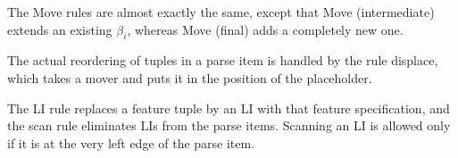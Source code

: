 \begin{prooftree}
\end{prooftree}
%
\begin{prooftree}
\end{prooftree}
%
The Move rules are almost exactly the same, except that Move (intermediate) extends an existing $\beta_i$, whereas Move (final) adds a completely new one.

The actual reordering of tuples in a parse item is handled by the rule displace, which takes a mover and puts it in the position of the placeholder.
%
\begin{prooftree}
\end{prooftree}
%
\begin{prooftree}
\end{prooftree}

The LI rule replaces a feature tuple by an LI with that feature specification, and the scan rule eliminates LIs from the parse items.
Scanning an LI is allowed only if it is at the very left edge of the parse item.
%
\begin{prooftree}
\end{prooftree}
%
\begin{prooftree}
\end{prooftree}

